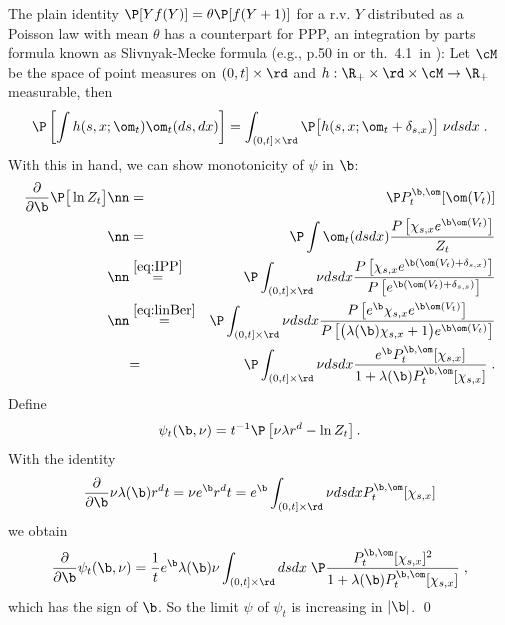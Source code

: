 The plain identity $\P [Yf(Y)]= \theta \P[f(Y+1)]$ for a r.v. $Y$ distributed as a Poisson law with mean $\theta$ has a counterpart for PPP,
an integration by parts formula known as Slivnyak-Mecke formula (e.g., p.50 in \cite{KendallStoyanMecke} or th.~4.1~in \cite{LastPenrose}):  Let $\cM$ be the space of point measures on $(0,t] \times \rd$ and $h: 
\R_+ \times \rd \times {\cM} \to \R_+$ measurable, then
\begin{equation}
\label{eq:IPP}
\P \left[ \int h(s,x; \om_t) \om_t(ds,dx) \right]= \int_{(0,t]\times \rd}  \P\big[ h(s,x; \om_t + \delta_{s,x}) \big]\; \nu ds dx  \;.
\end{equation}
With this in hand, we can show monotonicity of $\psi$ in $\b$: 
\begin{eqnarray} 
\frac{\partial }{\partial \b} \P \big[ \ln Z_t \big]
 \nn &=& \P \gibbs [\om(V_t)]   \\
 \nn &=& \P \int \om_t(ds dx)  \frac{ P\left[ \chi_{s,x} e^{\b \om(V_t)} \right]}{Z_t}\\
\nn &\stackrel{\eqref{eq:IPP}}{=}& \P \int_{(0,t]\times \rd} \nu ds dx  \frac{ P\left[ \chi_{s,x} e^{\b (\om(V_t)+\delta_{s,x})} \right]}{P\left[ 
e^{\b (\om(V_t)+\delta_{s,s})} \right]}  \\
\nn &\stackrel{\eqref{eq:linBer}}{=}& \P \int_{(0,t]\times \rd} \nu ds dx  \frac{ P\left[ e^\b \chi_{s,x} e^{\b \om(V_t)} \right]}{P\left[ \big(\lambda(\b)\chi_{s,x}
+1\big) e^{\b \om(V_t)} \right]} \\
\label{eq:meanenergy} 
&{=}& \P \int_{(0,t]\times \rd} \nu ds dx  \frac{ e^\b \gibbs[\chi_{s,x}]}{1+ \lambda(\b) \gibbs[\chi_{s,x}]} \;.
\end{eqnarray}
Define 
\begin{equation}
\label{def:psit}
\psi_t(\b,\nu) = t^{-1} \P \left[ \nu \lambda r^d -\ln Z_t \right] .
\end{equation}
With the identity
$$ \frac{\partial }{\partial \b} \nu \lambda(\b)r^dt = \nu e^{\b} r^d t =  e^{\b} \int_{(0,t]\times \rd} \nu ds dx \gibbs[ \chi_{s,x}]$$
we obtain
\begin{equation}
\label{eq:psi'}
\frac{\partial }{\partial \b}  \psi_t(\b,\nu) = \frac{1}{t}e^\b \lambda(\b) \nu 
 \int_{(0,t]\times \rd}  ds dx \; \P \frac{ \gibbs[  \chi_{s,x}]^2}{1+ \lambda(\b) \gibbs[\chi_{s,x}]} \;,
 \end{equation}
which has the sign of $\b$. So the limit $\psi$ of $\psi_t$ is increasing in $|\b |$. \qed

